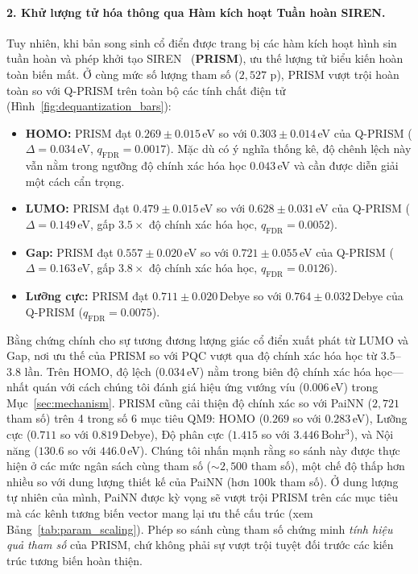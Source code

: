 \documentclass[10pt,twocolumn,letterpaper]{article}
\begin{document}
\paragraph{2. Khử lượng tử hóa thông qua Hàm kích hoạt Tuần hoàn SIREN.}
Tuy nhiên, khi bản song sinh cổ điển được trang bị các hàm kích hoạt hình sin tuần hoàn và phép khởi tạo SIREN~\cite{sitzmann2020siren} (\textbf{PRISM}), ưu thế lượng tử biểu kiến hoàn toàn biến mất.
Ở cùng mức số lượng tham số ($2{,}527$ p), PRISM vượt trội hoàn toàn so với Q-PRISM trên toàn bộ các tính chất điện tử (Hình~\ref{fig:dequantization_bars}):
\begin{itemize}
    \item \textbf{HOMO:} PRISM đạt $0.269 \pm 0.015$\,eV so với $0.303 \pm 0.014$\,eV của Q-PRISM ($\Delta = 0.034$\,eV, $q_{\mathrm{FDR}} = 0.0017$). Mặc dù có ý nghĩa thống kê, độ chênh lệch này vẫn nằm trong ngưỡng độ chính xác hóa học $0.043$\,eV và cần được diễn giải một cách cẩn trọng.
    \item \textbf{LUMO:} PRISM đạt $0.479 \pm 0.015$\,eV so với $0.628 \pm 0.031$\,eV của Q-PRISM ($\Delta = 0.149$\,eV, gấp $3.5\times$ độ chính xác hóa học, $q_{\mathrm{FDR}} = 0.0052$).
    \item \textbf{Gap:} PRISM đạt $0.557 \pm 0.020$\,eV so với $0.721 \pm 0.055$\,eV của Q-PRISM ($\Delta = 0.163$\,eV, gấp $3.8\times$ độ chính xác hóa học, $q_{\mathrm{FDR}} = 0.0126$).
    \item \textbf{Lưỡng cực:} PRISM đạt $0.711 \pm 0.020$\,Debye so với $0.764 \pm 0.032$\,Debye của Q-PRISM ($q_{\mathrm{FDR}} = 0.0075$).
\end{itemize}
Bằng chứng chính cho sự tương đương lượng giác cổ điển xuất phát từ LUMO và Gap, nơi ưu thế của PRISM so với PQC vượt qua độ chính xác hóa học từ $3.5$--$3.8$ lần. Trên HOMO, độ lệch ($0.034$\,eV) nằm trong biên độ chính xác hóa học---nhất quán với cách chúng tôi đánh giá hiệu ứng vướng víu ($0.006$\,eV) trong Mục~\ref{sec:mechanism}.
PRISM cũng cải thiện độ chính xác so với PaiNN ($2{,}721$ tham số) trên 4 trong số 6 mục tiêu QM9: HOMO ($0.269$ so với $0.283$\,eV), Lưỡng cực ($0.711$ so với $0.819$\,Debye), Độ phân cực ($1.415$ so với $3.446$\,Bohr$^3$), và Nội năng ($130.6$ so với $446.0$\,eV).
Chúng tôi nhấn mạnh rằng so sánh này được thực hiện ở các mức ngân sách cùng tham số ($\sim 2{,}500$ tham số), một chế độ thấp hơn nhiều so với dung lượng thiết kế của PaiNN (hơn $100$k tham số). Ở dung lượng tự nhiên của mình, PaiNN được kỳ vọng sẽ vượt trội PRISM trên các mục tiêu mà các kênh tương biến vector mang lại ưu thế cấu trúc (xem Bảng~\ref{tab:param_scaling}). Phép so sánh cùng tham số chứng minh \textit{tính hiệu quả tham số} của PRISM, chứ không phải sự vượt trội tuyệt đối trước các kiến trúc tương biến hoàn thiện.
\end{document}
